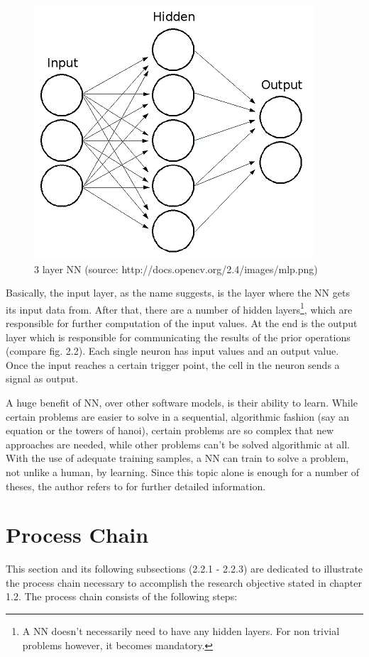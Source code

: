 \begin{figure}[H]
	\begin{center}
		\includegraphics[scale=0.7]{img/mlp.png}
		\caption{3 layer NN (source: http://docs.opencv.org/2.4/\textunderscore images/mlp.png)}
		\label{fig:fig2.2}
	\end{center}
\end{figure}

Basically, the input layer, as the name suggests, is the layer where the NN gets its input data from. After that, there are a number of hidden layers\footnote{A NN doesn't necessarily need to have any hidden layers. For non trivial problems however, it becomes mandatory.}, which are responsible for further computation of the input values. At the end is the output layer which is responsible for communicating the results of the prior operations (compare fig. 2.2). Each single neuron has input values and an output value. Once the input reaches a certain trigger point, the cell in the neuron sends a signal as output. 

A huge benefit of NN, over other software models, is their ability to learn. While certain problems are easier to solve in a sequential, algorithmic fashion (say an equation or the towers of hanoi), certain problems are so complex that new approaches are needed, while other problems can't be solved algorithmic at all. With the use of adequate training samples, a NN can train to solve a problem, not unlike a human, by learning. Since this topic alone is enough for a number of theses, the author refers to \cite{Kriesel07} for further detailed information.


\section{Process Chain}
This section and its following subsections (2.2.1 - 2.2.3) are dedicated to illustrate the process chain necessary to accomplish the research objective stated in chapter 1.2. The process chain consists of the following steps:

